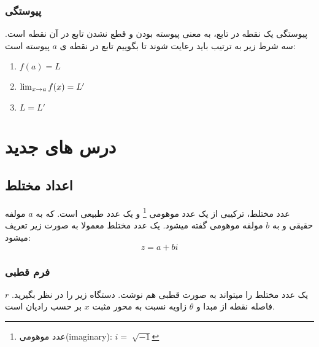 \documentclass[12pt, a4paper, oneside]{article}
\begin{document}
\subsubsection{پیوستگی}
پیوستگی یک نقطه در تابع، به معنی پیوسته بودن و قطع نشدن تابع در آن نقطه است. سه شرط زیر به ترتیب باید رعایت شوند تا بگوییم تابع در نقطه ی $a$ پیوسته است:
\begin{latin}
\begin{enumerate}
    \item $f(a) = L$
    \item $\lim_{x \to a} f(x) = L'$
    \item $L = L'$
\end{enumerate}
\end{latin}

\section{درس های جدید}
\subsection{اعداد مختلط}
عدد مختلط، ترکیبی از یک عدد موهومی \footnote{عدد موهومی(imaginary): $i=\sqrt[]{-1}$} و یک عدد طبیعی است.
که به $a$ مولفه حقیقی و به $b$ مولفه موهومی گفته میشود.
یک عدد مختلط معمولا به صورت زیر تعریف میشود: 
\[z = a + bi\]
\subsubsection{فرم قطبی}
یک عدد مختلط را میتواند به صورت قطبی هم نوشت. دستگاه زیر را در نظر بگیرید. $r$ فاصله نقطه از مبدا و $\theta$ زاویه نسبت به محور مثبت $x$ بر حسب رادیان است.

\end{document}
